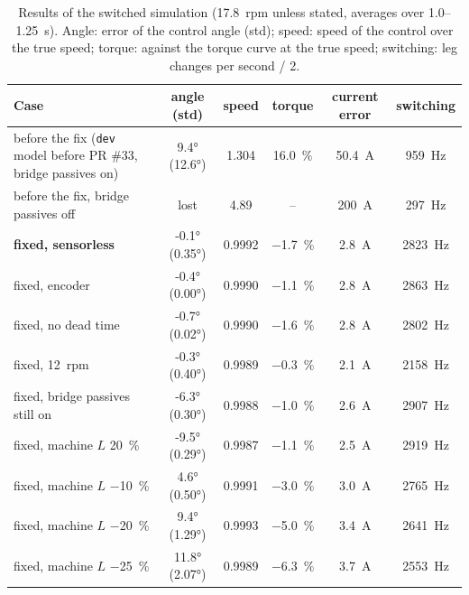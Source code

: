 \documentclass[11pt,a4paper]{scrartcl}
\newcommand{\code}[1]{\texttt{#1}}
\begin{document}
\begin{onehalfspace}
\begin{table}[H]
	\centering
	\footnotesize
	\caption{Results of the switched simulation (\SI{17.8}{rpm} unless stated, averages over 1.0--\SI{1.25}{\second}). Angle: error of the control angle (std); speed: speed of the control over the true speed; torque: against the torque curve at the true speed; switching: leg changes per second / 2.}
	\label{tab:results}
	\setlength{\tabcolsep}{4pt}
	\begin{tabularx}{\textwidth}{@{} X c c c c c @{}}
		\toprule
		\textbf{Case} & \textbf{angle (std)} & \textbf{speed} & \textbf{torque} & \textbf{current error} & \textbf{switching} \\
		\midrule
		before the fix (\code{dev} model before PR \#33, bridge passives on) & \ang{+9.4} (\ang{12.6}) & 1.304 & \SI{+16.0}{\percent} & \SI{50.4}{\ampere} & \SI{959}{\hertz} \\
		before the fix, bridge passives off & lost & 4.89 & -- & \SI{200}{\ampere} & \SI{297}{\hertz} \\
		\textbf{fixed, sensorless} & \ang{-0.1} (\ang{0.35}) & 0.9992 & \SI{-1.7}{\percent} & \SI{2.8}{\ampere} & \SI{2823}{\hertz} \\
		fixed, encoder & \ang{-0.4} (\ang{0.00}) & 0.9990 & \SI{-1.1}{\percent} & \SI{2.8}{\ampere} & \SI{2863}{\hertz} \\
		fixed, no dead time & \ang{-0.7} (\ang{0.02}) & 0.9990 & \SI{-1.6}{\percent} & \SI{2.8}{\ampere} & \SI{2802}{\hertz} \\
		fixed, \SI{12}{rpm} & \ang{-0.3} (\ang{0.40}) & 0.9989 & \SI{-0.3}{\percent} & \SI{2.1}{\ampere} & \SI{2158}{\hertz} \\
		fixed, bridge passives still on & \ang{-6.3} (\ang{0.30}) & 0.9988 & \SI{-1.0}{\percent} & \SI{2.6}{\ampere} & \SI{2907}{\hertz} \\
		fixed, machine $L$ \SI{+20}{\percent} & \ang{-9.5} (\ang{0.29}) & 0.9987 & \SI{-1.1}{\percent} & \SI{2.5}{\ampere} & \SI{2919}{\hertz} \\
		fixed, machine $L$ \SI{-10}{\percent} & \ang{+4.6} (\ang{0.50}) & 0.9991 & \SI{-3.0}{\percent} & \SI{3.0}{\ampere} & \SI{2765}{\hertz} \\
		fixed, machine $L$ \SI{-20}{\percent} & \ang{+9.4} (\ang{1.29}) & 0.9993 & \SI{-5.0}{\percent} & \SI{3.4}{\ampere} & \SI{2641}{\hertz} \\
		fixed, machine $L$ \SI{-25}{\percent} & \ang{+11.8} (\ang{2.07}) & 0.9989 & \SI{-6.3}{\percent} & \SI{3.7}{\ampere} & \SI{2553}{\hertz} \\

\end{tabularx}
\end{table}
\end{onehalfspace}
\end{document}
